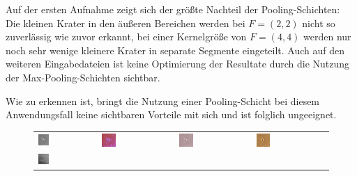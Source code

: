 Auf der ersten Aufnahme zeigt sich der größte Nachteil der Pooling-Schichten: Die kleinen Krater in den äußeren Bereichen werden bei $F=(2, 2)$ nicht so zuverlässig wie zuvor erkannt, bei einer Kernelgröße von $F=(4, 4)$ werden nur noch sehr wenige kleinere Krater in separate Segmente eingeteilt. Auch auf den weiteren Eingabedateien ist keine Optimierung der Resultate durch die Nutzung der Max-Pooling-Schichten sichtbar.

Wie zu erkennen ist, bringt die Nutzung einer Pooling-Schicht bei diesem Anwendungsfall keine sichtbaren Vorteile mit sich und ist folglich ungeeignet.

\begin{figure}[h!]
	\begin{tabular}{C{0.24\textwidth}C{0.24\textwidth}C{0.24\textwidth}C{0.24\textwidth}}
		\includegraphics[width=0.2\textwidth]{images/p03/p03_01.png} &
		\includegraphics[width=0.2\textwidth]{images/gen/pooling_layers/p03_01.png_1.png} &
		\includegraphics[width=0.2\textwidth]{images/gen/pooling_layers/p03_01.png_2.png} &
		\includegraphics[width=0.2\textwidth]{images/gen/pooling_layers/p03_01.png_4.png} \\
		\includegraphics[width=0.2\textwidth]{images/p03/p03_02.png} &

\end{tabular}
\end{figure}
